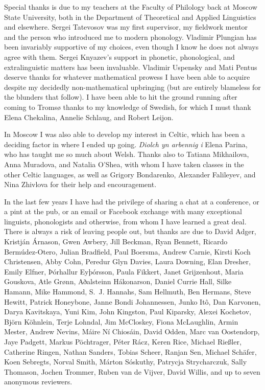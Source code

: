 Special thanks is due to my teachers at the Faculty of Philology back at Moscow State University, both in the Department of Theoretical and Applied Linguistics and elsewhere. Sergei Tatevosov was my first supervisor, my fieldwork mentor and the person who introduced me to modern phonology. Vladimir Plungian has been invariably supportive of my choices, even though I know he does not always agree with them. Sergei Knyazev's support in phonetic, phonological, and extralinguistic matters has been invaluable. Vladimir Uspensky and Mati Pentus deserve thanks for whatever mathematical prowess I have been able to acquire despite my decidedly non\hyp mathematical upbringing (but are entirely blameless for the blunders that follow). I have been able to hit the ground running after coming to Tromsø thanks to my knowledge of Swedish, for which I must thank Elena Chekalina, Annelie Schlaug, and Robert Leijon.

In Moscow I was also able to develop my interest in Celtic, which has been a deciding factor in where I ended up going. \emph{Diolch yn arbennig i} Elena Parina, who has taught me so much about Welsh. Thanks also to Tatiana Mikhailova, Anna Muradova, and Natalia O'Shea, with whom I have taken classes in the other Celtic languages, as well as Grigory Bondarenko, Alexander Falileyev, and Nina Zhivlova for their help and encouragement.

In the last few years I have had the privilege of sharing a chat at a conference, or a pint at the pub, or an email or Facebook exchange with many exceptional linguists, phonologists and otherwise, from whom I have learned a great deal. There is always a risk of leaving people out, but thanks are due to David Adger, Kristján Árnason, Gwen Awbery, Jill Beckman, Ryan Bennett, Ricardo Bermúdez-Otero, Julian Bradfield, Paul Boersma, Andrew Carnie, Kirsti Koch Christensen, Abby Cohn, Peredur Glyn Davies, Laura Downing, Elan Dresher, Emily Elfner, Þórhallur Eyþórsson, Paula Fikkert, Janet Grijzenhout, Maria Gouskova, Atle Grønn, Aðalsteinn Hákonarson, Daniel Currie Hall, Silke Hamann, Mike Hammond, S.~J. Hannahs, Sam Hellmuth, Ben Hermans, Steve Hewitt, Patrick Honeybone, Janne Bondi Johannessen, Junko Itô, Dan Karvonen, Darya Kavitskaya, Yuni Kim, John Kingston, Paul Kiparsky, Alexei Kochetov, Björn Köhnlein, Terje Lohndal, Jim McCloskey, Fiona McLaughlin, Armin Mester, Andrew Nevins, Máire Ní Chiosáin, David Odden, Marc van Oostendorp, Jaye Padgett, Markus Pöchtrager, Péter Rácz, Keren Rice, Michael Rießler, Catherine Ringen, Nathan Sanders, Tobias Scheer, Ranjan Sen, Michael Schäfer, Koen Sebregts, Norval Smith, Márton Sóskuthy, Patrycja Strycharczuk, Sally Thomason, Jochen Trommer, Ruben van de Vijver, David Willis, and up to seven anonymous reviewers.

